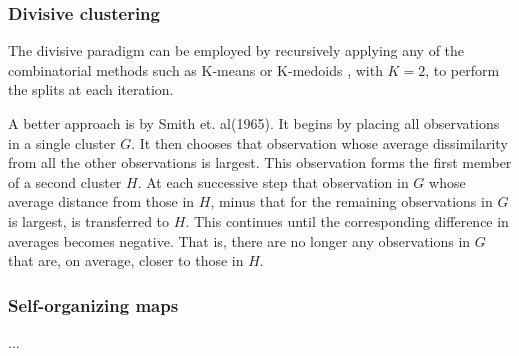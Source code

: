 \documentclass[12pt, letterpaper]{article}
\theoremstyle{definition}
\begin{document}
\subsubsection{Divisive clustering}
The divisive paradigm can be employed by recursively applying any of the combinatorial methods such as K-means or K-medoids , with $K = 2$, to perform the splits at each iteration.

A better approach is by Smith et. al(1965). It begins by placing all observations in a single cluster $G$. It then chooses that observation whose average dissimilarity from all the other observations is largest. This observation forms the first member of a second cluster $H$. At each successive step that observation in $G$ whose average distance from those in $H$, minus that for the remaining observations in $G$ is largest, is transferred to $H$. This continues until the corresponding difference in averages becomes negative. That is, there are no longer any observations in $G$ that are, on average, closer to those in $H$.

\subsubsection{Self-organizing maps}
...
\end{document}
